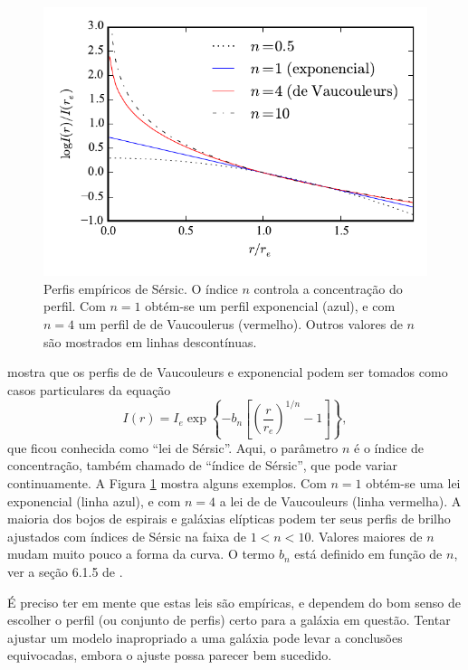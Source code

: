
\begin{figure}
	\includegraphics{figuras/morphModels}
	\caption[Perfis empíricos de Sérsic]
	{Perfis empíricos de Sérsic. O índice $n$ controla a concentração do perfil.
	Com $n\!=\!1$ obtém-se um perfil exponencial (azul), e com $n\!=\!4$ um perfil
	de de Vaucoulerus (vermelho). Outros valores de $n$ são mostrados em
	linhas descontínuas.}
	\label{fig:MorphLaws}
\end{figure}

\citet{Sersic1963} mostra que os perfis de de Vaucouleurs e exponencial podem
ser tomados como casos particulares da equação
\begin{equation*}
I(r) = I_e \exp \left\{- b_n \left[ \left( \frac{r}{r_e} \right)^{1/n}
- 1 \right] \right\},
\end{equation*}
que ficou conhecida como ``lei de Sérsic''. Aqui, o parâmetro $n$ é o índice de
concentração, também chamado de ``índice de Sérsic'', que pode variar
continuamente. A Figura \ref{fig:MorphLaws} mostra alguns exemplos. Com
$n\!=\!1$ obtém-se uma lei exponencial (linha azul), e com $n\!=\!4$ a lei de de
Vaucouleurs (linha vermelha). A maioria dos bojos de espirais e galáxias
elípticas podem ter seus perfis de brilho ajustados com índices de Sérsic na
faixa de $1 < n < 10$. Valores maiores de $n$ mudam muito pouco a forma da
curva. O termo $b_n$ está definido em função de $n$, ver a seção 6.1.5 de
\citet{Erwin2015}.

É preciso ter em mente que estas leis são empíricas, e dependem do bom senso de
escolher o perfil (ou conjunto de perfis) certo para a galáxia em questão.
Tentar ajustar um modelo inapropriado a uma galáxia pode levar a conclusões
equivocadas, embora o ajuste possa parecer bem sucedido.

